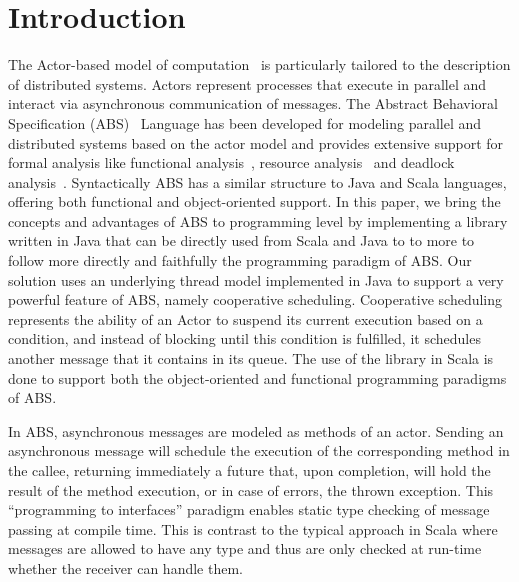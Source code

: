 \section{Introduction}



The Actor-based model of computation~\cite{Agha} is particularly tailored to the description of distributed systems. 
Actors represent processes that execute in parallel and interact via asynchronous communication of messages. 
The Abstract Behavioral Specification (ABS)~\cite{abs} Language has been developed for modeling parallel and distributed systems based on the actor model and provides extensive support for formal analysis like functional analysis~\cite{KeY}, resource analysis~\cite{saco} and deadlock analysis~\cite{dead}. Syntactically ABS has a similar structure to Java and Scala languages, offering both functional and object-oriented support.
In this paper, we bring the concepts and advantages of ABS to programming level by implementing a library written in Java that can be directly used from Scala and Java to to more to follow more directly and faithfully the programming paradigm of ABS. Our solution uses an underlying thread model implemented in Java to support a very powerful feature of ABS, namely cooperative scheduling. Cooperative scheduling represents the ability of an Actor to suspend its current execution based on a condition, and instead of blocking until this condition is fulfilled, it schedules another message that it contains in its queue.  
The use of the library in Scala is done to support both the object-oriented and functional programming paradigms of ABS. 


\par In ABS, asynchronous messages are modeled as methods of an actor.
Sending an asynchronous message will schedule the execution of the corresponding method in the callee, returning immediately a future that, upon completion, will hold the result of the method execution, or in case of errors, the thrown exception.
This ``programming to interfaces'' paradigm enables static type checking of message passing at compile time.
This is contrast to the typical approach in Scala where messages are allowed to have any type and thus are only checked at run-time whether the receiver can handle them.

